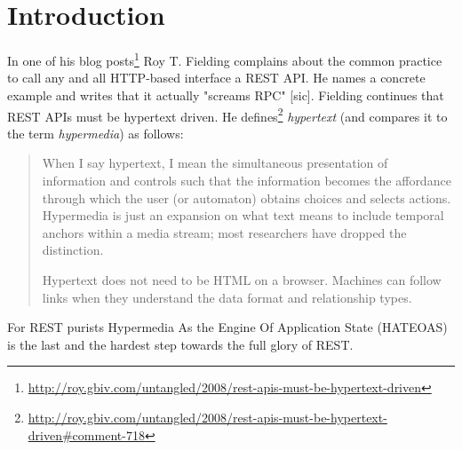 \documentclass{acm_proc_article-sp}
\begin{document}
\maketitle
\begin{abstract}

\end{abstract}




\section{Introduction}\label{sec:introduction}
In one of his blog posts\footnote{\url{http://roy.gbiv.com/untangled/2008/rest-apis-must-be-hypertext-driven}} Roy T. Fielding complains about the common practice to call any and all HTTP-based interface a REST API. He names a concrete example and writes that it actually "screams RPC" [sic]. Fielding continues that REST APIs must be hypertext driven. He defines\footnote{\url{http://roy.gbiv.com/untangled/2008/rest-apis-must-be-hypertext-driven#comment-718}} \textit{hypertext} (and compares it to the term \textit{hypermedia}) as follows:
\begin{quotation}
When I say hypertext, I mean the simultaneous presentation of information and controls such that the information becomes the affordance through which the user (or automaton) obtains choices and selects actions. Hypermedia is just an expansion on what text means to include temporal anchors within a media stream; most researchers have dropped the distinction.

Hypertext does not need to be HTML on a browser. Machines can follow links when they understand the data format and relationship types.
\end{quotation}
For REST purists Hypermedia As the Engine Of Application State (HATEOAS) is the last and the hardest step towards the full glory of REST.
\end{document}
